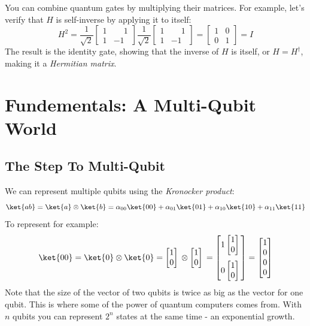 \documentclass[11pt]{article}
\newcommand{\igate}{
  \begin{bmatrix}
  1 & 0 \\
  0 & 1 
  \end{bmatrix}
}
\newcommand{\hgate}{
  \dfrac{1}{\sqrt2}
  \begin{bmatrix}
  1 & \phantom{-}1 \\
  1 & -1
  \end{bmatrix}
}
\newcommand{\qstatezero}{
  \begin{bmatrix}1 \\ 0\end{bmatrix}
}
\begin{document}
You can combine quantum gates by multiplying their matrices. For example, let's verify that $H$ is self-inverse by applying it to itself:
\[
  H^2 = \hgate{} \hgate{} = \igate{} = I
\]
The result is the identity gate, showing that the inverse of $H$ is itself, or $H = H^\dagger$, making it a \emph{Hermitian matrix}.

\newpage

\section{Fundementals: A Multi-Qubit World}
\subsection{The Step To Multi-Qubit}
We can represent multiple qubits using the \emph{Kronocker product}:
\[
  \ket{ab} = \ket{a} \otimes \ket{b} = \alpha_{00}\ket{00} + \alpha_{01}\ket{01} + \alpha_{10}\ket{10} + \alpha_{11}\ket{11}
\]
To represent  for example:
\[
  \ket{00} = \ket{0} \otimes \ket{0} = \qstatezero{} \otimes \qstatezero{} = 
  \begin{bmatrix}
    1\qstatezero{} \\[13pt]
    0\qstatezero{}
  \end{bmatrix}
  =
  \begin{bmatrix}
    1 \\
    0 \\
    0 \\
    0
  \end{bmatrix}
\]
Note that the size of the vector of two qubits is twice as big as the vector for one qubit. This is where some of the power of quantum computers comes from. With $n$ qubits you can represent $2^n$ states at the same time - an exponential growth.
\end{document}
